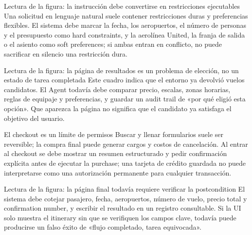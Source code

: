 \begin{knowledgebox}{Lectura de la figura: la instrucción debe convertirse en restricciones ejecutables}
Una solicitud en lenguaje natural suele contener restricciones duras y preferencias flexibles. El sistema debe marcar la fecha, los aeropuertos, el número de personas y el presupuesto como hard constraints, y la aerolínea United, la franja de salida o el asiento como soft preferences; si ambas entran en conflicto, no puede sacrificar en silencio una restricción dura.
\end{knowledgebox}


\begin{knowledgebox}{Lectura de la figura: la página de resultados es un problema de elección, no un estado de tarea completada}
Este cuadro indica que el entorno ya devolvió vuelos candidatos. El Agent todavía debe comparar precio, escalas, zonas horarias, reglas de equipaje y preferencias, y guardar un audit trail de «por qué eligió esta opción». Que aparezca la página no significa que el candidato ya satisfaga el objetivo del usuario.
\end{knowledgebox}


\begin{warningbox}{El checkout es un límite de permisos}
Buscar y llenar formularios suele ser reversible; la compra final puede generar cargos y costos de cancelación. Al entrar al checkout se debe mostrar un resumen estructurado y pedir confirmación explícita antes de ejecutar la purchase; una tarjeta de crédito guardada no puede interpretarse como una autorización permanente para cualquier transacción.
\end{warningbox}


\begin{knowledgebox}{Lectura de la figura: la página final todavía requiere verificar la postcondition}
El sistema debe cotejar pasajero, fecha, aeropuertos, número de vuelo, precio total y confirmation number, y escribir el resultado en un registro consultable. Si la UI solo muestra el itinerary sin que se verifiquen los campos clave, todavía puede producirse un falso éxito de «flujo completado, tarea equivocada».
\end{knowledgebox}

